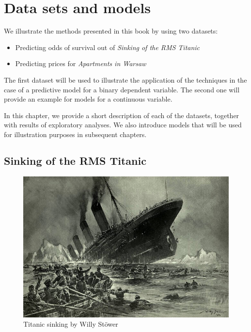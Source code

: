 \documentclass[12pt,]{krantz}
\providecommand{\tightlist}{%
  \setlength{\itemsep}{0pt}\setlength{\parskip}{0pt}}
\begin{document}
\hypertarget{dataSetsIntro}{%
\section{Data sets and models}\label{dataSetsIntro}}

We illustrate the methods presented in this book by using two datasets:

\begin{itemize}
\tightlist
\item
  Predicting odds of survival out of \emph{Sinking of the RMS Titanic}
\item
  Predicting prices for \emph{Apartments in Warsaw}
\end{itemize}

The first dataset will be used to illustrate the application of the techniques in the case of a predictive model for a binary dependent variable. The second one will provide an example for models for a continuous variable.

In this chapter, we provide a short description of each of the datasets, together with results of exploratory analyses. We also introduce models that will be used for illustration purposes in subsequent chapters.

\hypertarget{TitanicDataset}{%
\subsection{Sinking of the RMS Titanic}\label{TitanicDataset}}

\begin{figure}
\centering
\includegraphics{figure/Titanic.jpg}
\caption{Titanic sinking by Willy Stöwer}
\end{figure}
\end{document}
